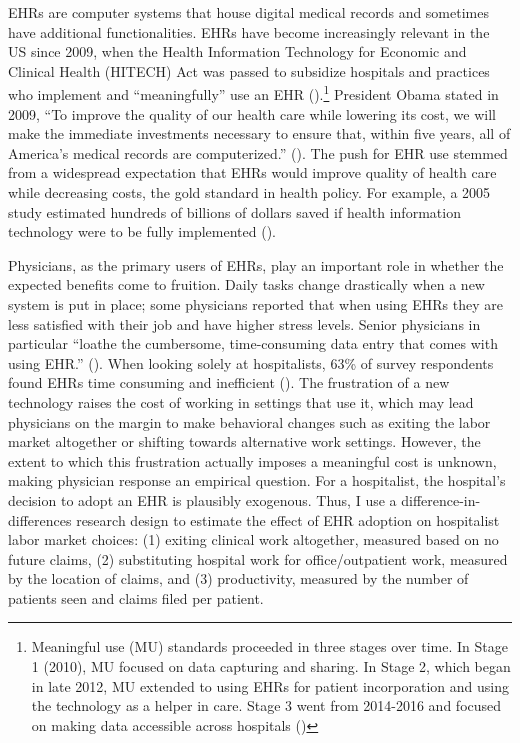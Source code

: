 \documentclass[12pt]{article}
\begin{document}
EHRs are computer systems that house digital medical records and sometimes have additional functionalities. EHRs have become increasingly relevant in the US since 2009, when the Health Information Technology for Economic and Clinical Health (HITECH) Act was passed to subsidize hospitals and practices who implement and ``meaningfully'' use an EHR (\cite{hitech}).\footnote{Meaningful use (MU) standards proceeded in three stages over time. In Stage 1 (2010), MU focused on data capturing and sharing. In Stage 2, which began in late 2012, MU extended to using EHRs for patient incorporation and using the technology as a helper in care. Stage 3 went from 2014-2016 and focused on making data accessible across hospitals (\cite{meanuse})} President Obama stated in 2009, “To improve the quality of our health care while lowering its cost, we will make the immediate investments necessary to ensure that, within five years, all of America’s medical records are computerized.” (\cite{presquote}). The push for EHR use stemmed from a widespread expectation that EHRs would improve quality of health care while decreasing costs, the gold standard in health policy. For example, a 2005 study estimated hundreds of billions of dollars saved if health information technology were to be fully implemented (\cite{hillestad2005}).

Physicians, as the primary users of EHRs, play an important role in whether the expected benefits come to fruition. Daily tasks change drastically when a new system is put in place; some physicians reported that when using EHRs they are less satisfied with their job and have higher stress levels. Senior physicians in particular “loathe the cumbersome, time-consuming data entry that comes with using EHR.” (\cite{CollierBurnout}). When looking solely at hospitalists, 63\% of survey respondents found EHRs time consuming and inefficient (\cite{czernik2022hospitalist}). The frustration of a new technology raises the cost of working in settings that use it, which may lead physicians on the margin to make behavioral changes such as exiting the labor market altogether or shifting towards alternative work settings. However, the extent to which this frustration actually imposes a meaningful cost is unknown, making physician response an empirical question. For a hospitalist, the hospital's decision to adopt an EHR is plausibly exogenous. Thus, I use a difference-in-differences research design to estimate the effect of EHR adoption on hospitalist labor market choices: (1) exiting clinical work altogether, measured based on no future claims, (2) substituting hospital work for office/outpatient work, measured by the location of claims, and (3) productivity, measured by the number of patients seen and claims filed per patient.
\end{document}
